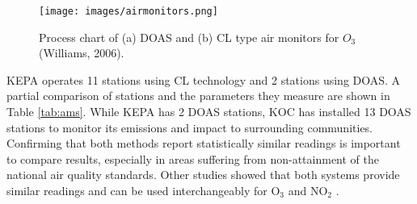 \begin{figure}[H]
\centering
\texttt{[image: images/airmonitors.png]} 
\caption[Process chart of air measurement technologies]{Process chart of (a) DOAS and (b) CL type air monitors for $O_{3}$ (Williams, 2006).}
\label{fig:airmonitors}
\end{figure}

%
KEPA operates 11 stations using CL technology and 2 stations using DOAS. A partial comparison of stations and the parameters they measure are shown in Table \ref{tab:ams}. While KEPA has 2 DOAS stations, KOC has installed 13 DOAS stations to monitor its emissions and impact to surrounding communities. Confirming that both methods report statistically similar readings is important to compare results, especially in areas suffering from non-attainment of the national air quality standards. Other studies showed that both systems provide similar readings and can be used interchangeably for O$_{3}$ and NO$_{2}$ \cite{Williams2006, Langridge2006}. 

